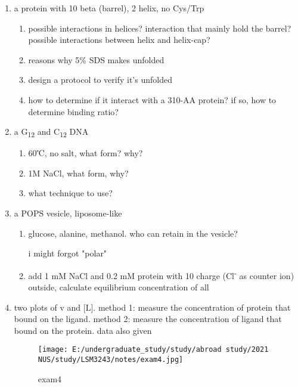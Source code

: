 \documentclass[]{article}
\begin{document}
\begin{enumerate}
\def\labelenumi{\arabic{enumi}.}
\item
  a protein with 10 beta (barrel), 2 helix, no Cys/Trp

  \begin{enumerate}
  \def\labelenumii{\arabic{enumii}.}
  \item
    possible interactions in helices? interaction that mainly hold the
    barrel? possible interactions between helix and helix-cap?
  \item
    reasons why 5\% SDS makes unfolded
  \item
    design a protocol to verify it's unfolded
  \item
    how to determine if it interact with a 310-AA protein? if so, how to
    determine binding ratio?
  \end{enumerate}
\item
  a G\textsubscript{12} and C\textsubscript{12} DNA

  \begin{enumerate}
  \def\labelenumii{\arabic{enumii}.}
  \item
    60℃, no salt, what form? why?
  \item
    1M NaCl, what form, why?
  \item
    what technique to use?
  \end{enumerate}
\item
  a POPS vesicle, liposome-like

  \begin{enumerate}
  \def\labelenumii{\arabic{enumii}.}
  \item
    glucose, alanine, methanol. who can retain in the vesicle?

    i might forgot "polar"
  \item
    add 1 mM NaCl and 0.2 mM protein with 10 charge
    (Cl\textsuperscript{-} as counter ion) outside, calculate
    equilibrium concentration of all
  \end{enumerate}
\item
  two plots of v and {[}L{]}. method 1: measure the concentration of
  protein that bound on the ligand. method 2: measure the concentration
  of ligand that bound on the protein. data also given

  \begin{figure}
  \centering
  \texttt{[image: E:/undergraduate\_study/study/abroad study/2021 NUS/study/LSM3243/notes/exam4.jpg]}
  \caption{exam4}
  \end{figure}


\end{enumerate}
\end{document}
